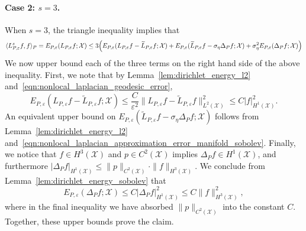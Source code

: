 \documentclass[aos]{imsart}
\theoremstyle{plain}
\theoremstyle{definition}
\theoremstyle{remark}
\newcommand{\dotp}[2]{\langle #1, #2 \rangle}
\newcommand{\wt}[1]{\widetilde{#1}}
\newcommand{\mc}[1]{\mathcal{#1}}
\newcommand{\1}{\mathbf{1}}
\begin{document}
\paragraph{Case 2: $s = 3$.}
When $s = 3$, the triangle inequality implies that
\begin{equation*}
\dotp{L_{P,\varepsilon}^sf}{f}_P = E_{P,\varepsilon}(L_{P,\varepsilon}f;\mc{X}) \leq 3\Bigl( E_{P,\varepsilon}(L_{P,\varepsilon}f - \wt{L}_{P,\varepsilon}f;\mc{X}) +  E_{P,\varepsilon}(\wt{L}_{P,\varepsilon}f - \sigma_{\eta} \Delta_Pf;\mc{X}) + \sigma_{\eta}^2 E_{P,\varepsilon}(\Delta_Pf;\mc{X})\Bigr)
\end{equation*}
We now upper bound each of the three terms on the right hand side of the above inequality. First, we note that by Lemma~\ref{lem:dirichlet_energy_l2} and~\eqref{eqn:nonlocal_laplacian_geodesic_error}, 
\begin{equation*}
E_{P,\varepsilon}(L_{P,\varepsilon}f - \wt{L}_{P,\varepsilon}f;\mc{X}) \leq  \frac{C}{\varepsilon^2}\|L_{P,\varepsilon}f - \wt{L}_{P,\varepsilon}f\|_{L^2(\mc{X})}^2 \leq C |f|_{H^1(\mc{X})}^2.
\end{equation*}
An equivalent upper bound on $E_{P,\varepsilon}(\wt{L}_{P,\varepsilon}f - \sigma_{\eta} \Delta_Pf;\mc{X})$ follows from Lemma~\ref{lem:dirichlet_energy_l2} and~\eqref{eqn:nonlocal_laplacian_approximation_error_manifold_sobolev}. Finally, we notice that $f \in H^3(\mc{X})$ and $p \in C^2(\mc{X})$ implies $\Delta_Pf \in H^1(\mc{X})$, and furthermore $|\Delta_Pf|_{H^1(\mc{X})} \leq \|p\|_{C^2(\mc{X})} \cdot \|f\|_{H^3(\mc{X})}$. We conclude from Lemma~\ref{lem:dirichlet_energy_sobolev} that
\begin{equation*}
E_{P,\varepsilon}(\Delta_Pf;\mc{X}) \leq C |\Delta_Pf|_{H^1(\mc{X})}^2 \leq C \|f\|_{H^3(\mc{X})}^2,
\end{equation*}
where in the final inequality we have absorbed $\|p\|_{C^2(\mc{X})}$ into the constant $C$. Together, these upper bounds prove the claim.
\end{document}
